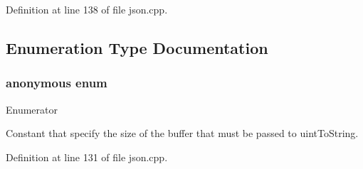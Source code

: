Definition at line 138 of file json.\-cpp.



\subsection{Enumeration Type Documentation}
\hypertarget{namespace_json_a0c5f614b019f20b4598dcaec09d9e820}{\subsubsection[{anonymous enum}]{\setlength{\rightskip}{0pt plus 5cm}anonymous enum}}\label{namespace_json_a0c5f614b019f20b4598dcaec09d9e820}
\begin{Desc}
\item[Enumerator]\par
\begin{description}
\item[{\em 
\hypertarget{namespace_json_a0c5f614b019f20b4598dcaec09d9e820ae4f2008c7919f20d81286121d1374424}{uint\-To\-String\-Buffer\-Size}\label{namespace_json_a0c5f614b019f20b4598dcaec09d9e820ae4f2008c7919f20d81286121d1374424}
}]Constant that specify the size of the buffer that must be passed to uint\-To\-String. \end{description}
\end{Desc}


Definition at line 131 of file json.\-cpp.


